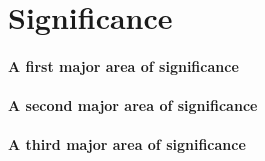 \section{Significance}

\paragraph{A first major area of significance}

\lipsum[1-2]

\cbstart
\lipsum[3-3]
\cbend

\paragraph{A second major area of significance}

\lipsum[4-5]

\paragraph{A third major area of significance}

\lipsum[6-10]
